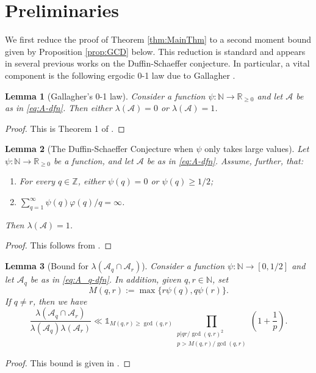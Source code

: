 \documentclass[12pt]{amsart}
\numberwithin{equation}{section}
\newtheorem{lem}{Lemma}[section]
\theoremstyle{definition}
\theoremstyle{remark}
\newcommand{\N}{\mathbb{N}}
\newcommand{\R}{\mathbb{R}}
\newcommand{\CA}{\mathcal{A}}
\newcommand{\un}{\mathds{1}}
\renewcommand{\phi}{\varphi}
\renewcommand{\ge}{\geqslant}
\begin{document}
\section{Preliminaries}\label{sec:Prelim}

We first reduce the proof of Theorem \ref{thm:MainThm} to a second moment bound given by Proposition \ref{prop:GCD} below. This reduction is standard and appears in several previous works on the Duffin-Schaeffer conjecture. In particular, a vital component is the following ergodic 0-1 law due to Gallagher \cite{gallagher}.


\begin{lem}[Gallagher's 0-1 law]\label{lem:Gallagher}
Consider a function $\psi:\N\to\R_{\ge0}$ and let $\CA$ be as in \eqref{eq:A-dfn}. Then either $\lambda(\CA)=0$ or $\lambda(\CA)=1$. 
\end{lem}
\begin{proof}
This is Theorem 1 of \cite{gallagher}.
\end{proof}

\begin{lem}[The Duffin-Schaeffer Conjecture when $\psi$ only takes large values]\label{lem:Large}
Let $\psi:\N\rightarrow\R_{\ge 0}$ be a function, and let $\CA$ be as in \eqref{eq:A-dfn}. Assume, further, that:
\begin{enumerate}
\item For every $q\in\mathbb{Z}$, either $\psi(q)=0$ or $\psi(q)\ge 1/2$;
\item $\sum_{q=1}^\infty \psi(q)\phi(q)/q=\infty$.
\end{enumerate}
Then $\lambda(\CA)=1$.
\end{lem}

\begin{proof}
This follows from \cite[Theorem 2]{PV}.
\end{proof}
\begin{lem}[Bound for $\lambda(\CA_q\cap\CA_r)$]\label{lem:Pollington}
Consider a function $\psi:\N\to[0,1/2]$ and let $\CA_q$ be as in \eqref{eq:A_q-dfn}. In addition, given $q,r\in\N$, set
\[
M(q,r):=\max\{r\psi(q),q\psi(r)\}.
\]
If $q\neq r$, then we have
\[
\frac{\lambda(\CA_q\cap \CA_r)}
{\lambda(\CA_q)\lambda(\CA_r)}
	\ll \un_{M(q,r)\ge \gcd(q,r)} 
	\prod_{\substack{p|qr/\gcd(q,r)^2 \\ p>M(q,r)/\gcd(q,r)}} \left(1+\frac{1}{p}\right) .
\]
\end{lem}
\begin{proof}
This bound is given in \cite[p. 195-196]{PV}.
\end{proof}
\end{document}
